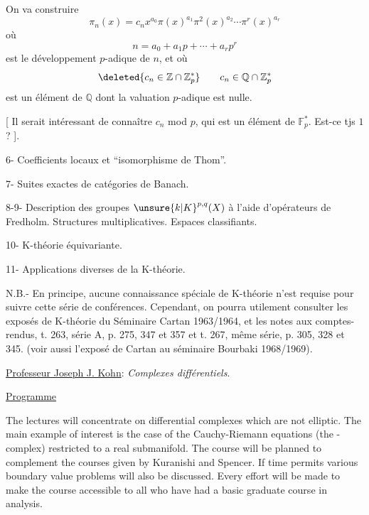 On va construire
\[
\pi_n(x)=c_nx^{a_0}\pi(x)^{a_1}\pi^2(x)^{a_2}\cdots\pi^r(x)^{a_r}
\]
où
\[
n=a_0+a_1p+\cdots+a_rp^r
\]
est le développement $p$-adique de $n$, et où 
\[
\deleted{c_n\in\mathbb Z\cap\mathbb Z_p^*}\qquad c_n\in\mathbb Q\cap\mathbb Z_p^*
\]
est un élément de $\mathbb Q$ dont la valuation $p$-adique est nulle.

[ Il serait intéressant de connaître $c_n$ mod $p$, qui est un élément de $\mathbb F_p^*$. Est-ce tjs $1$? ].


6- Coefficients locaux et ``isomorphisme de Thom''.

7- Suites exactes de catégories de Banach.

8-9- Description des groupes $\unsure{k|K}^{p,q}(X)$ à l'aide d'opérateurs de Fredholm. Structures multiplicatives. Espaces classifiants.

10- K-théorie équivariante.

11- Applications diverses de la K-théorie.

N.B.- En principe, aucune connaissance spéciale de K-théorie n'est requise pour suivre cette série de conférences. Cependant, on pourra utilement consulter les exposés de K-théorie du Séminaire Cartan 1963/1964, et les notes aux comptes-rendus, t. 263, série A, p. 275, 347 et 357 et t. 267, même série, p. 305, 328 et 345. (voir aussi l'exposé de Cartan au séminaire Bourbaki 1968/1969).

\uline{Professeur Joseph J. Kohn}: \textit{Complexes différentiels}.

\uline{Programme}

The lectures will concentrate on differential complexes which are not elliptic. The main example of interest is the case of the Cauchy-Riemann equations (the \quad- complex) restricted to a real submanifold. The course will be planned to complement the courses given by Kuranishi and Spencer. If time permits various boundary value problems will also be discussed. Every effort will be made to make the course accessible to all who have had a basic graduate course in analysis.

\margin{$\ldots/$}


